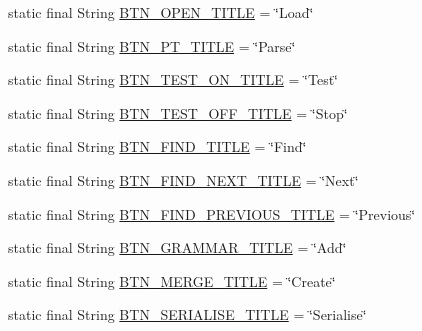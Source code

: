 \begin{DoxyCompactItemize}
\item 
static final String \hyperlink{classit_1_1emarolab_1_1cagg_1_1debugging_1_1DebuggingDefaults_a1c9cdb4b1c13ebc155d1208725aa14b2}{B\-T\-N\-\_\-\-O\-P\-E\-N\-\_\-\-T\-I\-T\-L\-E} = \char`\"{}Load\char`\"{}
\item 
static final String \hyperlink{classit_1_1emarolab_1_1cagg_1_1debugging_1_1DebuggingDefaults_acf68afb85989e9a4ee388c5ce524a8d4}{B\-T\-N\-\_\-\-P\-T\-\_\-\-T\-I\-T\-L\-E} = \char`\"{}Parse\char`\"{}
\item 
static final String \hyperlink{classit_1_1emarolab_1_1cagg_1_1debugging_1_1DebuggingDefaults_aa574fc8b31272fde3bc80cc3afa8cd27}{B\-T\-N\-\_\-\-T\-E\-S\-T\-\_\-\-O\-N\-\_\-\-T\-I\-T\-L\-E} = \char`\"{}Test\char`\"{}
\item 
static final String \hyperlink{classit_1_1emarolab_1_1cagg_1_1debugging_1_1DebuggingDefaults_ab8c0d6fba4275f95516dd06a79a01a36}{B\-T\-N\-\_\-\-T\-E\-S\-T\-\_\-\-O\-F\-F\-\_\-\-T\-I\-T\-L\-E} = \char`\"{}Stop\char`\"{}
\item 
static final String \hyperlink{classit_1_1emarolab_1_1cagg_1_1debugging_1_1DebuggingDefaults_a0e36c0c39eca88c11bcbfc1d90133a27}{B\-T\-N\-\_\-\-F\-I\-N\-D\-\_\-\-T\-I\-T\-L\-E} = \char`\"{}Find\char`\"{}
\item 
static final String \hyperlink{classit_1_1emarolab_1_1cagg_1_1debugging_1_1DebuggingDefaults_a1be1d1909f6b28ae4126b3ff5feda061}{B\-T\-N\-\_\-\-F\-I\-N\-D\-\_\-\-N\-E\-X\-T\-\_\-\-T\-I\-T\-L\-E} = \char`\"{}Next\char`\"{}
\item 
static final String \hyperlink{classit_1_1emarolab_1_1cagg_1_1debugging_1_1DebuggingDefaults_a63c88f4a12bcab1feb1bc90029c96e62}{B\-T\-N\-\_\-\-F\-I\-N\-D\-\_\-\-P\-R\-E\-V\-I\-O\-U\-S\-\_\-\-T\-I\-T\-L\-E} = \char`\"{}Previous\char`\"{}
\item 
static final String \hyperlink{classit_1_1emarolab_1_1cagg_1_1debugging_1_1DebuggingDefaults_a0aedf6d2cb51e27c19dae8d79e71e074}{B\-T\-N\-\_\-\-G\-R\-A\-M\-M\-A\-R\-\_\-\-T\-I\-T\-L\-E} = \char`\"{}Add\char`\"{}
\item 
static final String \hyperlink{classit_1_1emarolab_1_1cagg_1_1debugging_1_1DebuggingDefaults_ad7bc45e0aa6ad8b1eed719694d692058}{B\-T\-N\-\_\-\-M\-E\-R\-G\-E\-\_\-\-T\-I\-T\-L\-E} = \char`\"{}Create\char`\"{}
\item 
static final String \hyperlink{classit_1_1emarolab_1_1cagg_1_1debugging_1_1DebuggingDefaults_abed09e3aa400434e0b6c7988f6262e5a}{B\-T\-N\-\_\-\-S\-E\-R\-I\-A\-L\-I\-S\-E\-\_\-\-T\-I\-T\-L\-E} = \char`\"{}Serialise\char`\"{}

\end{DoxyCompactItemize}
